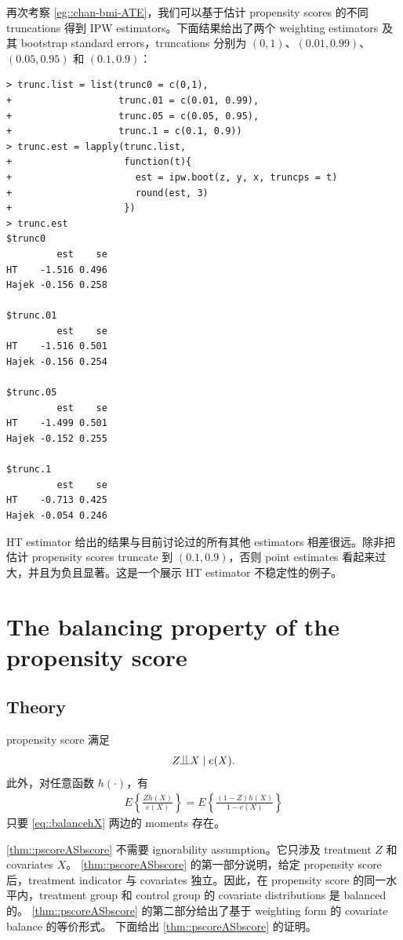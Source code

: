 再次考察 \cref{eg::chan-bmi-ATE}，我们可以基于估计 propensity scores 的不同 truncations 得到 IPW estimators。下面结果给出了两个 weighting estimators 及其 bootstrap standard errors，truncations 分别为 $(0,1)$、$(0.01, 0.99)$、$(0.05, 0.95)$ 和 $(0.1, 0.9)$：
\begin{lstlisting}
> trunc.list = list(trunc0 = c(0,1), 
+                   trunc.01 = c(0.01, 0.99), 
+                   trunc.05 = c(0.05, 0.95), 
+                   trunc.1 = c(0.1, 0.9))
> trunc.est = lapply(trunc.list,
+                    function(t){
+                      est = ipw.boot(z, y, x, truncps = t)
+                      round(est, 3)
+                    })
> trunc.est
$trunc0
         est    se
HT    -1.516 0.496
Hajek -0.156 0.258

$trunc.01
         est    se
HT    -1.516 0.501
Hajek -0.156 0.254

$trunc.05
         est    se
HT    -1.499 0.501
Hajek -0.152 0.255

$trunc.1
         est    se
HT    -0.713 0.425
Hajek -0.054 0.246
\end{lstlisting}
HT estimator 给出的结果与目前讨论过的所有其他 estimators 相差很远。除非把估计 propensity scores truncate 到 $(0.1, 0.9)$，否则 point estimates 看起来过大，并且为负且显著。这是一个展示 HT estimator 不稳定性的例子。



\section{The balancing property of the propensity score}


\subsection{Theory}



\begin{theorem}
\label{thm::pscoreASbscore}
propensity score 满足
$$
Z\ind X \mid e(X) .
$$ 
此外，对任意函数 $h(\cdot)$，有
\begin{eqnarray}
E\left\{   \frac{Zh(X)}{e(X)}   \right\} = E\left\{   \frac{(1-Z)h(X)}{1-e(X)}   \right\}
\label{eq::balancehX}
\end{eqnarray}
只要 \eqref{eq::balancehX} 两边的 moments 存在。
\end{theorem}

\cref{thm::pscoreASbscore} 不需要 ignorability assumption。它只涉及 treatment $Z$ 和 covariates $X$。
\cref{thm::pscoreASbscore} 的第一部分说明，给定 propensity score 后，treatment indicator 与 covariates 独立。因此，在 propensity score 的同一水平内，treatment group 和 control group 的 covariate distributions 是 balanced 的。
\cref{thm::pscoreASbscore} 的第二部分给出了基于 weighting form 的 covariate balance 的等价形式。
下面给出 \cref{thm::pscoreASbscore} 的证明。


